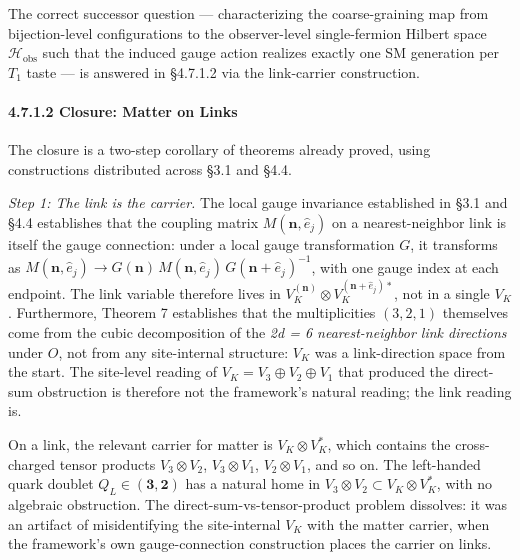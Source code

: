 \documentclass[
]{article}
\begin{document}
The correct successor question --- characterizing the coarse-graining
map from bijection-level configurations to the observer-level
single-fermion Hilbert space \(\mathcal{H}_{\text{obs}}\) such that the
induced gauge action realizes exactly one SM generation per \(T_1\)
taste --- is answered in §4.7.1.2 via the link-carrier construction.

\hypertarget{closure-matter-on-links}{%
\paragraph{4.7.1.2 Closure: Matter on
Links}\label{closure-matter-on-links}}

The closure is a two-step corollary of theorems already proved, using
constructions distributed across §3.1 and §4.4.

\emph{Step 1: The link is the carrier.} The local gauge invariance
established in §3.1 and §4.4 establishes that the coupling matrix
\(M(\mathbf{n}, \hat{e}_j)\) on a nearest-neighbor link is itself the
gauge connection: under a local gauge transformation \(G\), it
transforms as
\(M(\mathbf{n}, \hat{e}_j) \to G(\mathbf{n})\, M(\mathbf{n}, \hat{e}_j)\, G(\mathbf{n}+\hat{e}_j)^{-1}\),
with one gauge index at each endpoint. The link variable therefore lives
in \(V_K^{(\mathbf{n})} \otimes V_K^{(\mathbf{n}+\hat{e}_j)*}\), not in
a single \(V_K\). Furthermore, Theorem 7 establishes that the
multiplicities \((3, 2, 1)\) themselves come from the cubic
decomposition of the \emph{2d = 6 nearest-neighbor link directions}
under \(O\), not from any site-internal structure: \(V_K\) was a
link-direction space from the start. The site-level reading of
\(V_K = V_3 \oplus V_2 \oplus V_1\) that produced the direct-sum
obstruction is therefore not the framework's natural reading; the link
reading is.

On a link, the relevant carrier for matter is \(V_K \otimes V_K^*\),
which contains the cross-charged tensor products \(V_3 \otimes V_2\),
\(V_3 \otimes V_1\), \(V_2 \otimes V_1\), and so on. The left-handed
quark doublet \(Q_L \in (\mathbf{3}, \mathbf{2})\) has a natural home in
\(V_3 \otimes V_2 \subset V_K \otimes V_K^*\), with no algebraic
obstruction. The direct-sum-vs-tensor-product problem dissolves: it was
an artifact of misidentifying the site-internal \(V_K\) with the matter
carrier, when the framework's own gauge-connection construction places
the carrier on links.
\end{document}

